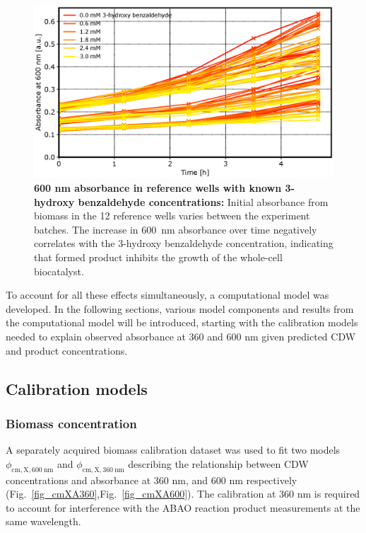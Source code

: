 \documentclass[sn-standardnature]{sn-jnl}%
\theoremstyle{thmstyleone}%
\theoremstyle{thmstyletwo}%
\theoremstyle{thmstylethree}%
\begin{document}
\begin{figure}[H]
    \centering
    \includegraphics[width=1.0\textwidth]{figures/Fig5.eps}
    \caption{
        \textbf{600 nm absorbance in reference wells with known 3-hydroxy benzaldehyde concentrations:}
        Initial absorbance from biomass in the 12 reference wells varies between the experiment batches.
        The increase in 600~nm absorbance over time negatively correlates with the 3-hydroxy benzaldehyde concentration, indicating that formed product inhibits the growth of the whole-cell biocatalyst.
    }
    \label{fig_a600kinetics}
\end{figure}

To account for all these effects simultaneously, a computational model was developed.
In the following sections, various model components and results from the computational model will be introduced, starting with the calibration models needed to explain observed absorbance at 360 and 600 nm given predicted CDW and product concentrations.

\subsection{Calibration models}
\label{sec_calibrations}

\subsubsection{Biomass concentration}

A separately acquired biomass calibration dataset was used to fit two models $\phi_\mathrm{cm,X,600\ nm}$ and $\phi_\mathrm{cm,X,360\ nm}$ describing the relationship between CDW concentrations and absorbance at 360 nm, and 600 nm respectively (Fig.~\ref{fig_cmXA360},Fig.~\ref{fig_cmXA600}).
The calibration at 360 nm is required to account for interference with the ABAO reaction product measurements at the same wavelength.
\end{document}
